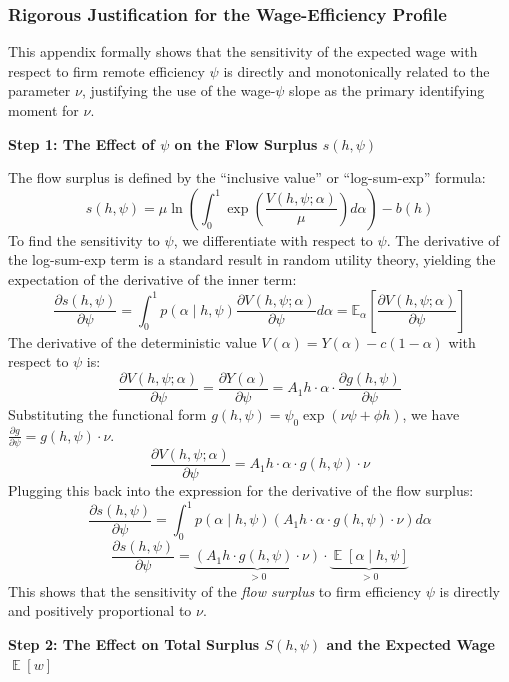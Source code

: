 \documentclass[
  11pt,
  letterpaper,
  DIV=11,
  numbers=noendperiod]{scrartcl}
\DeclareMathOperator*{\Exp}{\mathbb{E}} %
\begin{document}
\subsubsection{Rigorous Justification for the Wage-Efficiency
Profile}\label{rigorous-justification-for-the-wage-efficiency-profile}

This appendix formally shows that the sensitivity of the expected wage
with respect to firm remote efficiency \(\psi\) is directly and
monotonically related to the parameter \(\nu\), justifying the use of
the wage-\(\psi\) slope as the primary identifying moment for \(\nu\).

\textbf{Step 1: The Effect of \(\psi\) on the Flow Surplus
\(s(h, \psi)\)}

The flow surplus is defined by the ``inclusive value'' or
``log-sum-exp'' formula:
\[ s(h, \psi) = \mu \ln \left( \int_0^1 \exp\left(\frac{V(h, \psi; \alpha)}{\mu}\right) d\alpha \right) - b(h) \]
To find the sensitivity to \(\psi\), we differentiate with respect to
\(\psi\). The derivative of the log-sum-exp term is a standard result in
random utility theory, yielding the expectation of the derivative of the
inner term:
\[ \frac{\partial s(h, \psi)}{\partial \psi} = \int_0^1 p(\alpha \mid h, \psi) \frac{\partial V(h, \psi; \alpha)}{\partial \psi} d\alpha = \mathbb{E}_{\alpha} \left[ \frac{\partial V(h, \psi; \alpha)}{\partial \psi} \right] \]
The derivative of the deterministic value
\(V(\alpha) = Y(\alpha) - c(1-\alpha)\) with respect to \(\psi\) is:
\[ \frac{\partial V(h, \psi; \alpha)}{\partial \psi} = \frac{\partial Y(\alpha)}{\partial \psi} = A_1 h \cdot \alpha \cdot \frac{\partial g(h, \psi)}{\partial \psi} \]
Substituting the functional form
\(g(h, \psi) = \psi_0 \exp(\nu\psi + \phi h)\), we have
\(\frac{\partial g}{\partial \psi} = g(h, \psi) \cdot \nu\).
\[ \frac{\partial V(h, \psi; \alpha)}{\partial \psi} = A_1 h \cdot \alpha \cdot g(h, \psi) \cdot \nu \]
Plugging this back into the expression for the derivative of the flow
surplus:
\[ \frac{\partial s(h, \psi)}{\partial \psi} = \int_0^1 p(\alpha \mid h, \psi) \left( A_1 h \cdot \alpha \cdot g(h, \psi) \cdot \nu \right) d\alpha \]
\[ \frac{\partial s(h, \psi)}{\partial \psi} = \underbrace{\left( A_1 h \cdot g(h, \psi) \cdot \nu \right)}_{>0} \cdot \underbrace{\Exp[\alpha \mid h, \psi]}_{>0} \]
This shows that the sensitivity of the \emph{flow surplus} to firm
efficiency \(\psi\) is directly and positively proportional to \(\nu\).

\textbf{Step 2: The Effect on Total Surplus \(S(h, \psi)\) and the
Expected Wage \(\Exp[w]\)}
\end{document}
